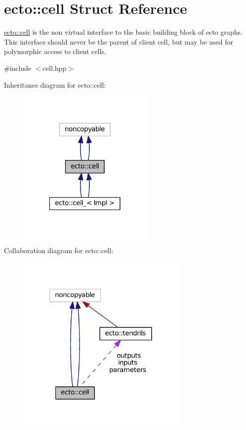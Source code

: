 \hypertarget{structecto_1_1cell}{\section{ecto\-:\-:cell Struct Reference}
\label{structecto_1_1cell}
}


\hyperlink{structecto_1_1cell}{ecto\-::cell} is the non virtual interface to the basic building block of ecto graphs. This interface should never be the parent of client cell, but may be used for polymorphic access to client cells.  




{\ttfamily \#include $<$cell.\-hpp$>$}



Inheritance diagram for ecto\-:\-:cell\-:\nopagebreak
\begin{figure}[H]
\begin{center}
\leavevmode
\includegraphics[width=186pt]{structecto_1_1cell__inherit__graph}
\end{center}
\end{figure}


Collaboration diagram for ecto\-:\-:cell\-:\nopagebreak
\begin{figure}[H]
\begin{center}
\leavevmode
\includegraphics[width=234pt]{structecto_1_1cell__coll__graph}
\end{center}
\end{figure}
